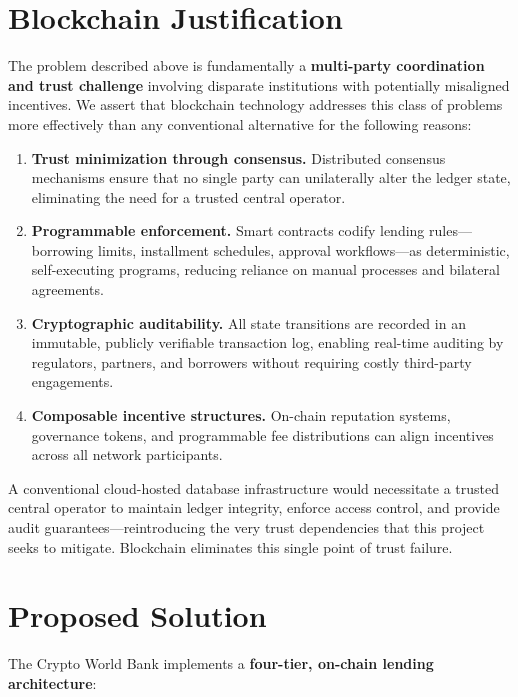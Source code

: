 \documentclass[12pt,a4paper]{report}
\begin{document}
\section{Blockchain Justification}

The problem described above is fundamentally a \textbf{multi-party coordination and trust challenge} involving disparate institutions with potentially misaligned incentives. We assert that blockchain technology addresses this class of problems more effectively than any conventional alternative for the following reasons:

\begin{enumerate}[noitemsep]
\item \textbf{Trust minimization through consensus.} Distributed consensus mechanisms ensure that no single party can unilaterally alter the ledger state, eliminating the need for a trusted central operator.

\item \textbf{Programmable enforcement.} Smart contracts codify lending rules---borrowing limits, installment schedules, approval workflows---as deterministic, self-executing programs, reducing reliance on manual processes and bilateral agreements.

\item \textbf{Cryptographic auditability.} All state transitions are recorded in an immutable, publicly verifiable transaction log, enabling real-time auditing by regulators, partners, and borrowers without requiring costly third-party engagements.

\item \textbf{Composable incentive structures.} On-chain reputation systems, governance tokens, and programmable fee distributions can align incentives across all network participants.
\end{enumerate}

A conventional cloud-hosted database infrastructure would necessitate a trusted central operator to maintain ledger integrity, enforce access control, and provide audit guarantees---reintroducing the very trust dependencies that this project seeks to mitigate. Blockchain eliminates this single point of trust failure.

\section{Proposed Solution}

The Crypto World Bank implements a \textbf{four-tier, on-chain lending architecture}:
\end{document}

